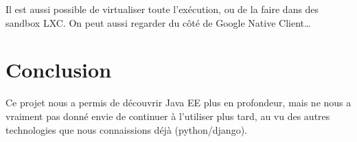 \documentclass[10pt]{scrartcl}
\begin{document}
  Il est aussi possible de virtualiser toute l'exécution, ou de la faire dans des sandbox LXC. On peut aussi regarder du
  côté de Google Native Client\ldots

\section{Conclusion}
  Ce projet nous a permis de découvrir Java EE plus en profondeur, mais ne nous
  a vraiment pas donné envie de continuer à l'utiliser plus tard, au vu des
  autres technologies que nous connaissions déjà (python/django).
\end{document}

